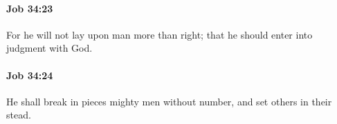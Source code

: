 		\paragraph{Job 34:23} %
			\label{JOB-34-23}

			For he will not lay upon man more than right; that he should enter into judgment with God.


		\paragraph{Job 34:24} %
			\label{JOB-34-24}

			He shall break in pieces mighty men without number, and set others in their stead.


